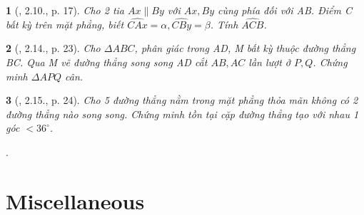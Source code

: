 \documentclass{article}
\newtheorem{baitoan}{}
\begin{document}
\begin{baitoan}[\cite{Hung_Mai_Toan_7_hinh_hoc}, 2.10., p. 17]
	Cho 2 tia $Ax\parallel By$ với $Ax,By$ cùng phía đối với AB. Điểm C bất kỳ trên mặt phẳng, biết $\widehat{CAx} = \alpha,\widehat{CBy} = \beta$. Tính $\widehat{ACB}$.
\end{baitoan}

\begin{baitoan}[\cite{Hung_Mai_Toan_7_hinh_hoc}, 2.14., p. 23]
	Cho $\Delta ABC$, phân giác trong AD, M bất kỳ thuộc đường thẳng BC. Qua M vẽ đường thẳng song song AD cắt $AB,AC$ lần lượt ở $P,Q$. Chứng minh $\Delta APQ$ cân.
\end{baitoan}

\begin{baitoan}[\cite{Hung_Mai_Toan_7_hinh_hoc}, 2.15., p. 24]
	Cho 5 đường thẳng nằm trong mặt phẳng thỏa mãn không có 2 đường thẳng nào song song. Chứng minh tồn tại cặp đường thẳng tạo với nhau 1 góc $< 36^\circ$.
\end{baitoan}
\cite[2.9., p. 17, 2.11, p. 20, 2.12., p. 21, 2.13, p. 22]{Hung_Mai_Toan_7_hinh_hoc}.


\section{Miscellaneous}


\printbibliography[heading=bibintoc]
	
\end{document}
